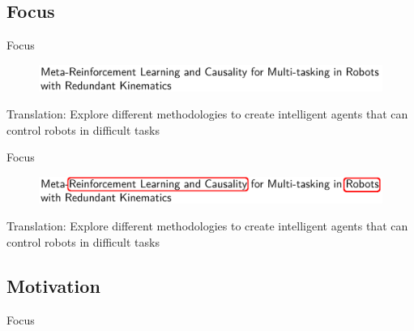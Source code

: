 \subsection{Focus}

\begin{frame}{Focus}
  \begin{figure}
    \centering
    \includegraphics[width=\textwidth]{img/title.png}
  \end{figure}
  \pause
  Translation: Explore different methodologies to create intelligent agents that can control robots in difficult tasks
\end{frame}

\begin{frame}{Focus}
  \begin{figure}
    \centering
    \includegraphics[width=\textwidth]{img/title_annotated.png}
  \end{figure}
  Translation: Explore different methodologies to create intelligent agents that can control robots in difficult tasks
\end{frame}
\subsection{Motivation}

\begin{frame}{Focus}
    
\end{frame}